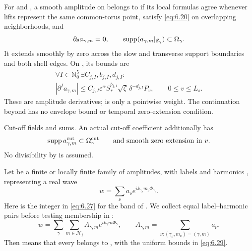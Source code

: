 \begin{definition}\label{def:6.5}
For  and
, a smooth amplitude
 on
 belongs to
 if its local formulas agree whenever
lifts represent the same common-torus point, satisfy \eqref{eq:6.20} on
overlapping neighborhoods, and
\[
  \partial_\theta a_{\gamma,m}=0,
  \qquad
  \operatorname{supp}(a_{\gamma,m}|_{\mathcal E_\gamma})\subset\Omega_\gamma.
\]
It extends smoothly by zero across the slow and transverse support boundaries
and both shell edges. On
, its bounds are
\begin{equation}
  \begin{gathered}
    \forall I\in\mathbb N_0^5\ \exists C_{j,I},b_{j,I},d_{j,I}:\\
    |\partial^Ia_{\gamma,m}|\le C_{j,I}\varepsilon^\alpha
      S_*^{b_{j,I}}\sqrt\zeta\,\delta^{-d_{j,I}}P_v,
    \qquad 0\le v\le L_s.
  \end{gathered}
  \tag{6.29}\label{eq:6.29}
\end{equation}
These are amplitude derivatives;  is only a
pointwise weight. The continuation beyond
 has no envelope bound or temporal zero-extension
condition.
\end{definition}

Cut-off fields and sums. An actual cut-off coefficient additionally has
\[
  \operatorname{supp} a_{\gamma,m}^{\mathrm{cut}}\subset\Omega_\gamma^{\mathrm{cut}}
  \qquad\text{and smooth zero extension in }v.
\]
No divisibility by  is assumed.

%
Let  be a finite or locally finite family of
amplitudes, with labels  and
harmonics , representing a real wave
\[
  w=\sum_\nu a_\nu e^{ik_{\gamma_\nu}m_\nu\Phi_{\gamma_\nu}}.
\]
Here  is the integer
 in \eqref{eq:6.27} for the band of
. We collect equal label--harmonic pairs before
testing membership in :
\[
  w=\sum_\gamma\sum_{m\in\mathscr H_j}
    A_{\gamma,m}e^{ik_\gamma m\Phi_\gamma},
  \qquad
  A_{\gamma,m}=\sum_{\nu:(\gamma_\nu,m_\nu)=(\gamma,m)}a_\nu.
\]
Then  means that every
 belongs to
, with the uniform bounds in
\eqref{eq:6.29}.

